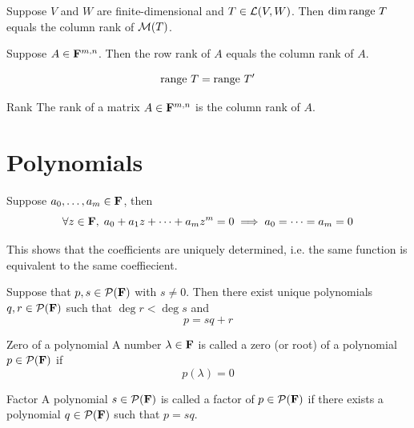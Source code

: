 \documentclass[12pt,a4paper]{article}
\begin{document}
    \begin{prop}
        Suppose $V$ and $W$ are finite-dimensional and $T\in\mathcal{L}(V,W)$. Then $\dim\operatorname{range\,} T$ equals the column rank of $\mathcal{M}(T)$.
    \end{prop}
    \hfill

    \begin{prop}
        Suppose $A\in\mathbf{F}^{m,n}$. Then the row rank of $A$ equals the column rank of $A$.
    \end{prop}
    \begin{remark}
        $$\operatorname{range\,} T=\operatorname{range\,} T'$$
    \end{remark}
    \hfill

    \begin{defi}{Rank}
        The rank of a matrix $A\in\mathbf{F}^{m,n}$ is the column rank of $A$.
    \end{defi}
    \hfill

    \section{Polynomials}%
    \begin{prop}
        Suppose $a_0,\dots,a_m\in\mathbf{F}$, then
        $$
        \forall z\in\mathbf{F},\;a_0+a_1z+\cdots+a_mz^m=0\implies a_0=\cdots=a_m=0
        $$
    \end{prop}
    \begin{remark}
        This shows that the coefficients are uniquely determined, i.e. the same function is equivalent to the same coeffiecient.
    \end{remark}
    \hfill
    
    \begin{prop}
    Suppose that $p,s\in\mathcal{P}(\mathbf{F})$ with $s\neq0$. Then there exist unique polynomials $q,r\in\mathcal{P}(\mathbf{F})$ such that $\deg r<\deg s$ and 
    $$
    p=sq+r
    $$
    \end{prop}
    \hfill

    \begin{defi}{Zero of a polynomial}
        A number $\lambda\in\mathbf{F}$ is called a zero (or root) of a polynomial $p\in\mathcal{P}(\mathbf{F})$ if
        $$p(\lambda)=0$$
    \end{defi}
    \begin{defi}{Factor}
        A polynomial $s\in\mathcal{P}(\mathbf{F})$ is called a factor of $p\in\mathcal{P}(\mathbf{F})$ if there exists a polynomial $q\in\mathcal{P}(\mathbf{F})$ such that $p=sq$.
    \end{defi}
    \hfill
\end{document}
